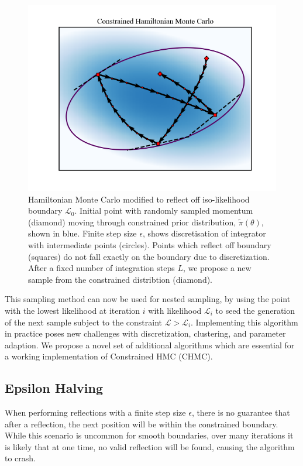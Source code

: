 \documentclass[11pt]{article}
\begin{document}
    \begin{figure}[h!]
        \center
        \includegraphics[width=\linewidth]{../figures/ConstrainedHMC}
        \caption{
        Hamiltonian Monte Carlo modified to reflect off iso-likelihood boundary $\mathcal{L}_0$.
        Initial point with randomly sampled
        momentum (diamond) moving through constrained prior distribution, $\tilde{\pi}(\theta)$, shown in blue.
        Finite step size $\epsilon$,
        shows discretisation of integrator with intermediate points (circles). Points which reflect off
        boundary (squares) do not fall exactly on the boundary due to discretization. After a fixed number of
        integration steps $L$, we propose a new sample from the constrained distribtion (diamond).
        }\label{fig:constrainedhmc}
    \end{figure}

    This sampling method can now be used for nested sampling, by using the point with the lowest
    likelihood at iteration $i$ with likelihood $\mathcal{L}_i$ to seed the generation of the next sample subject to
    the constraint $\mathcal{L} > \mathcal{L}_i$.
    Implementing this algorithm in practice poses new challenges with discretization, clustering, and parameter adaption.
    We propose a novel set of additional algorithms which are essential for a working implementation of
    Constrained HMC (CHMC).

\subsection{Epsilon Halving}\label{subsec:epsilon_halving}
    When performing reflections with a finite step size $\epsilon$, there is no guarantee that after a reflection,
    the next position will be within the constrained boundary.
    While this scenario is uncommon for smooth boundaries, over many iterations it is likely that at one time,
    no valid reflection will be found, causing the algorithm to crash.
\end{document}
